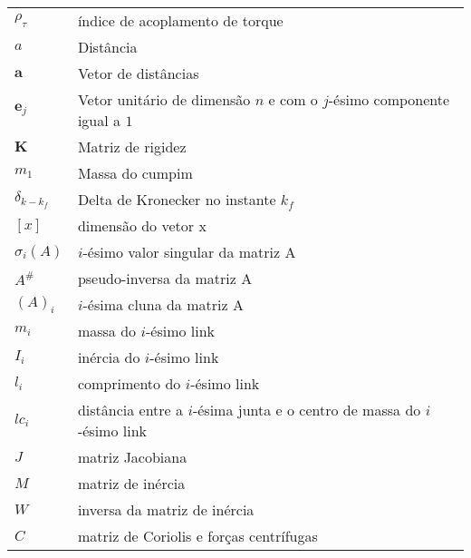 \begin{xltabular}{\textwidth}{l X}
    $\rho_{\tau}$    & índice de acoplamento de torque                                         \\
    $a$              & Distância                                                               \\
    $\textbf{a}$     & Vetor de distâncias                                                     \\
    $\textbf{e}_{j}$ & Vetor unitário de dimensão $n$ e com o $j$-ésimo componente igual a $1$ \\
    $\textbf{K}$     & Matriz de rigidez                                                       \\
    $m_1$            & Massa do cumpim                                                         \\
    $\delta_{k-k_f}$ & Delta de Kronecker no instante $k_f$                                    \\
    $[x]$            & dimensão do vetor x                                                     \\
    $\sigma_{i}(A)$  & $i$-ésimo valor singular da matriz A                                    \\
    $A^{\#}$         & pseudo-inversa da matriz A                                              \\
    $(A)_{i}$        & $i$-ésima cluna da matriz A                                             \\
    $m_{i}$          & massa do $i$-ésimo link                                                 \\
    $I_{i}$          & inércia do $i$-ésimo link                                               \\
    $l_{i}$          & comprimento do $i$-ésimo link                                           \\
    $lc_{i}$         & distância entre a $i$-ésima junta e o centro de massa do $i$-ésimo link \\
    $J$              & matriz Jacobiana                                                        \\
    $M$              & matriz de inércia                                                       \\
    $W$              & inversa da matriz de inércia                                            \\
    $C$              & matriz de Coriolis e forças centrífugas                                 \\

\end{xltabular}
